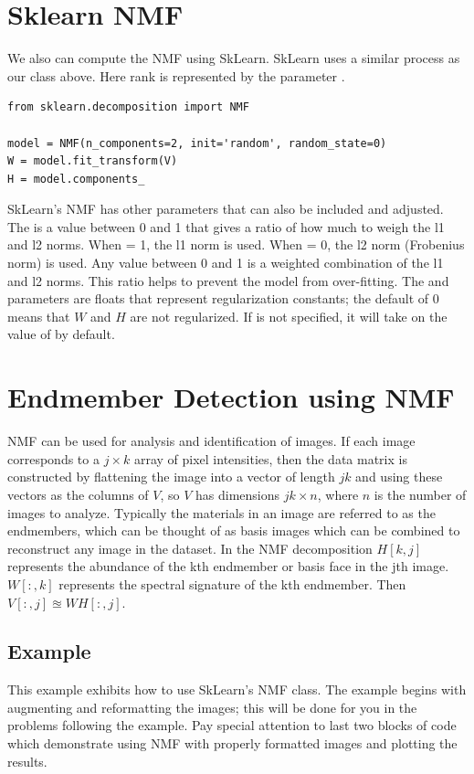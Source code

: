 \section*{Sklearn NMF}
We also can compute the NMF using SkLearn.
SkLearn uses a similar process as our class above.
Here rank is represented by the parameter .
\begin{lstlisting}
from sklearn.decomposition import NMF

model = NMF(n_components=2, init='random', random_state=0)
W = model.fit_transform(V)
H = model.components_
\end{lstlisting}
SkLearn's NMF has other parameters that can also be included and adjusted. The  is a value between 0 and 1 that gives a ratio of how much to weigh the l1 and l2 norms. When  = 1, the l1 norm is used. When  = 0, the l2 norm (Frobenius norm) is used. Any value between 0 and 1 is a weighted combination of the l1 and l2 norms. This ratio helps to prevent the model from over-fitting. The  and  parameters are floats that represent regularization constants; the default of 0 means that $W$ and $H$ are not regularized. If  is not specified, it will take on the value of  by default.

\section*{ Endmember Detection using NMF}
NMF can be used for analysis and identification of images. If each image corresponds to a $j \times k$ array of pixel intensities, then the data matrix is constructed by flattening the image into a vector of length $jk$ and using these vectors as the columns of $V$, so $V$ has dimensions $jk \times n$, where $n$ is the number of images to analyze.
Typically the materials in an image are referred to as the endmembers, which can be thought of as basis images which can be combined to reconstruct any image in the dataset.
In the NMF decomposition $H[k ,j]$ represents the abundance of the kth endmember or basis face in the jth image.
$W[:,k]$ represents the spectral signature of the kth endmember.
Then $V[:,j] \approxeq W H[:,j]$.

\subsection*{Example}
This example exhibits how to use SkLearn's NMF class. The example begins with augmenting and reformatting the images; this will be done for you in the problems following the example. Pay special attention to last two blocks of code which demonstrate using NMF with properly formatted images and plotting the results.


